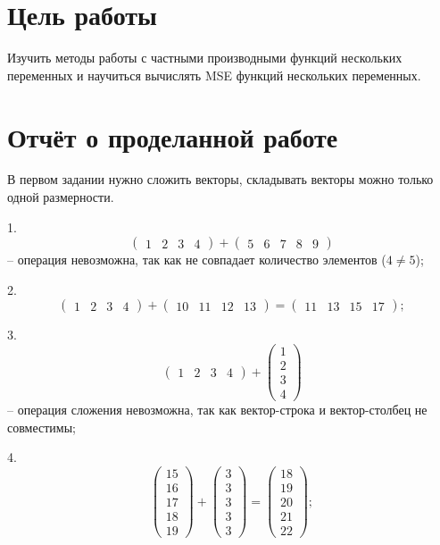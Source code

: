 \documentclass[14pt,a4paper]{extarticle}
\begin{document}


\section*{Цель работы}
        Изучить методы работы с частными производными
функций нескольких переменных и научиться вычислять 
MSE функций нескольких переменных.


\section*{Отчёт о проделанной работе}
В первом задании нужно сложить векторы, складывать векторы можно только одной размерности.

1. \[\begin{pmatrix} 1 & 2 & 3 & 4 \end{pmatrix} + \begin{pmatrix} 5 & 6 & 7 & 8 & 9 \end{pmatrix}\]
-- операция невозможна, так как не совпадает количество элементов ($4 \neq 5$);

2. \[\begin{pmatrix} 1 & 2 & 3 & 4 \end{pmatrix} + \begin{pmatrix} 10 & 11 & 12 & 13 \end{pmatrix} = \begin{pmatrix} 11 & 13 & 15 & 17 \end{pmatrix};\]

3. \[\begin{pmatrix} 1 & 2 & 3 & 4 \end{pmatrix} + \begin{pmatrix} 1 \\ 2 \\ 3 \\ 4 \end{pmatrix}\]
-- операция сложения невозможна, так как вектор-строка и вектор-столбец не совместимы;

4. \[\begin{pmatrix} 15 \\ 16 \\ 17 \\ 18 \\ 19 \end{pmatrix} + \begin{pmatrix} 3 \\ 3 \\ 3 \\ 3 \\ 3 \end{pmatrix} = \begin{pmatrix} 18 \\ 19 \\ 20 \\ 21 \\ 22 \end{pmatrix};\]
\end{document}
